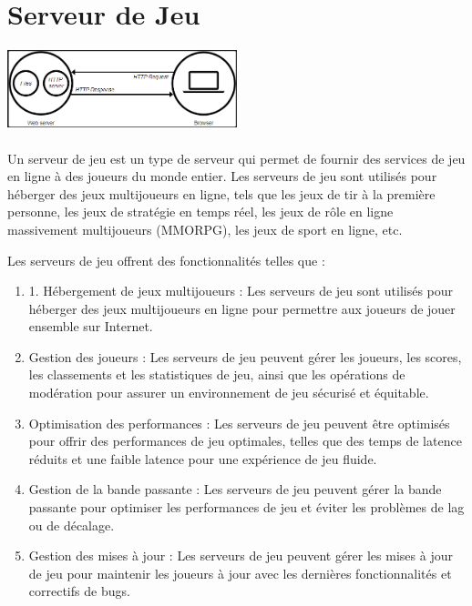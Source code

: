 \section{Serveur de Jeu}
\vspace{4mm}
\paragraph{
	\includegraphics[width=0.5\textwidth]{Server_web.png}}
\paragraph{ }
Un serveur de jeu est un type de serveur qui permet de fournir des services de jeu en ligne à des joueurs du monde entier. Les serveurs de jeu sont utilisés pour héberger des jeux multijoueurs en ligne, tels que les jeux de tir à la première personne, les jeux de stratégie en temps réel, les jeux de rôle en ligne massivement multijoueurs (MMORPG), les jeux de sport en ligne, etc.

Les serveurs de jeu offrent des fonctionnalités telles que :
\begin{enumerate}
	
  \item 1. Hébergement de jeux multijoueurs : Les serveurs de jeu sont utilisés pour héberger des jeux multijoueurs en ligne pour permettre aux joueurs de jouer ensemble sur Internet.
 
 \item  Gestion des joueurs : Les serveurs de jeu peuvent gérer les joueurs, les scores, les classements et les statistiques de jeu, ainsi que les opérations de modération pour assurer un environnement de jeu sécurisé et équitable.
 
 \item  Optimisation des performances : Les serveurs de jeu peuvent être optimisés pour offrir des performances de jeu optimales, telles que des temps de latence réduits et une faible latence pour une expérience de jeu fluide.
 
\item    Gestion de la bande passante : Les serveurs de jeu peuvent gérer la bande passante pour optimiser les performances de jeu et éviter les problèmes de lag ou de décalage.
 
 \item  Gestion des mises à jour : Les serveurs de jeu peuvent gérer les mises à jour de jeu pour maintenir les joueurs à jour avec les dernières fonctionnalités et correctifs de bugs.
 
\end{enumerate}


